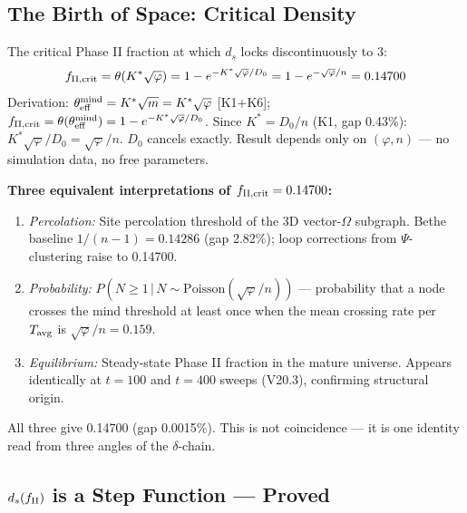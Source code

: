 \documentclass[12pt, a4paper]{article}
\begin{document}
\subsection{The Birth of Space: Critical Density}

\begin{keybox}[title={$f_{\rm II,crit} = 1 - e^{-\sqrt{\varphi}/n} = 0.14700$ --- Derived from K1 + K6}]
The critical Phase II fraction at which $d_s$ locks discontinuously to 3:
\[
  f_{\rm II,crit} = \theta\!\left(K^*\sqrt{\varphi}\right)
  = 1 - e^{-K^*\sqrt{\varphi}/D_0} = 1 - e^{-\sqrt{\varphi}/n} = 0.14700
\]
Derivation: $\theta_{\rm eff}^{\rm mind} = K^*\sqrt{m} = K^*\sqrt{\varphi}$ [K1+K6];
$f_{\rm II,crit} = \theta(\theta_{\rm eff}^{\rm mind}) = 1-e^{-K^*\sqrt{\varphi}/D_0}$.
Since $K^* = D_0/n$ (K1, gap 0.43\%): $K^*\sqrt{\varphi}/D_0 = \sqrt{\varphi}/n$.
$D_0$ cancels exactly. Result depends only on $(\varphi, n)$ --- no simulation data, no
free parameters.

\textbf{Three equivalent interpretations of $f_{\rm II,crit} = 0.14700$:}
\begin{enumerate}
\item \textit{Percolation:} Site percolation threshold of the 3D vector-$\Omega$ subgraph.
Bethe baseline $1/(n-1) = 0.14286$ (gap 2.82\%); loop corrections from $\Psi$-clustering raise to 0.14700.
\item \textit{Probability:} $P(N\geq 1\,|\,N\sim\mathrm{Poisson}(\sqrt{\varphi}/n))$ ---
probability that a node crosses the mind threshold at least once when the mean crossing
rate per $T_{\rm avg}$ is $\sqrt{\varphi}/n = 0.159$.
\item \textit{Equilibrium:} Steady-state Phase II fraction in the mature universe.
Appears identically at $t=100$ and $t=400$ sweeps (V20.3), confirming structural origin.
\end{enumerate}
All three give 0.14700 (gap 0.0015\%). This is not coincidence --- it is one identity
read from three angles of the $\delta$-chain.
\end{keybox}

\subsection{$d_s(f_{\rm II})$ is a Step Function --- Proved}
\end{document}
